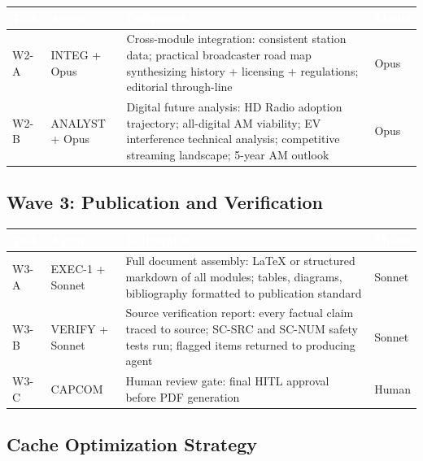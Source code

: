 \documentclass[11pt,letterpaper]{article}
\newcommand{\tableheader}[1]{\textbf{\sffamily\textcolor{white}{#1}}}
\begin{document}
\begin{asciibox}
\begin{center}
\begin{tabularx}{\textwidth}{L{2cm}L{2.5cm}XC{2cm}}
\toprule
{}
\tableheader{Task} & \tableheader{Agent} & \tableheader{Deliverable} & \tableheader{Model} \\
\midrule
W2-A & INTEG + Opus & Cross-module integration: consistent station data; practical broadcaster road map synthesizing history + licensing + regulations; editorial through-line & Opus \\
W2-B & ANALYST + Opus & Digital future analysis: HD Radio adoption trajectory; all-digital AM viability; EV interference technical analysis; competitive streaming landscape; 5-year AM outlook & Opus \\
\bottomrule
\end{tabularx}
\end{center}

\subsection{Wave 3: Publication and Verification}

\begin{center}
\begin{tabularx}{\textwidth}{L{2cm}L{2.5cm}XC{2cm}}
\toprule
{}
\tableheader{Task} & \tableheader{Agent} & \tableheader{Deliverable} & \tableheader{Model} \\
\midrule
W3-A & EXEC-1 + Sonnet & Full document assembly: LaTeX or structured markdown of all modules; tables, diagrams, bibliography formatted to publication standard & Sonnet \\
W3-B & VERIFY + Sonnet & Source verification report: every factual claim traced to source; SC-SRC and SC-NUM safety tests run; flagged items returned to producing agent & Sonnet \\
W3-C & CAPCOM & Human review gate: final HITL approval before PDF generation & Human \\
\bottomrule
\end{tabularx}
\end{center}

\subsection{Cache Optimization Strategy}


\end{asciibox}
\end{document}
